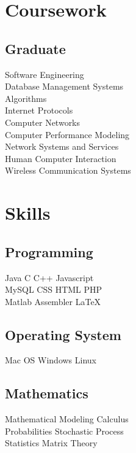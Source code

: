 \documentclass[]{Hsb_resume}
\begin{document}
\begin{minipage}[t]{0.33\textwidth}

\vspace{-4pt}
\section{Coursework}
\subsection{Graduate}
Software Engineering \\
Database Management Systems\\
Algorithms\\
Internet Protocols \\
Computer Networks\\
Computer Performance Modeling\\
Network Systems and Services \\
Human Computer Interaction \\
Wireless Communication Systems \\
\sectionsep


\vspace{-4pt}
\section{Skills}
\subsection{Programming}
Java \textbullet{}  C \textbullet{} C++ \textbullet{} Javascript \\
MySQL  \textbullet{} CSS \textbullet{} HTML \textbullet{} PHP  \\
Matlab \textbullet{} Assembler \textbullet{} \LaTeX\ \\ 
\vspace{8pt}
\subsection{Operating System}
Mac OS\textbullet{}  Windows \textbullet{} Linux \\
\vspace{8pt}
\subsection{Mathematics}
Mathematical Modeling  \textbullet{} Calculus  \\
Probabilities  \textbullet{} Stochastic Process\\
Statistics \textbullet{} Matrix Theory \\
\vspace{8pt}

\end{minipage}
\end{document}
